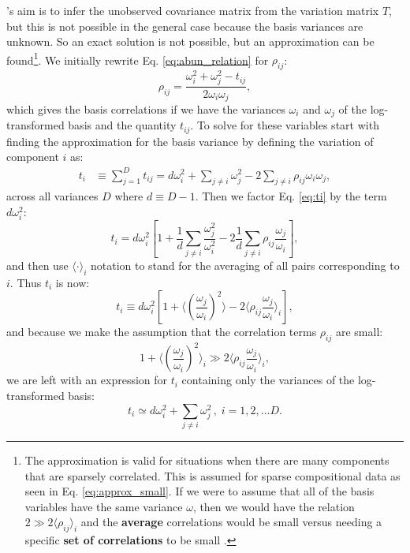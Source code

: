 \citeauthor{Friedman2012}'s aim is to infer the unobserved covariance matrix from the variation matrix $T$, but this is not possible in the general case because the basis variances are unknown. So an exact solution is not possible, but an approximation can be found\footnote{The approximation is valid for situations when there are many components that are sparsely correlated. This is assumed for sparse compositional data as seen in Eq. \ref{eq:approx_small}. If we were to assume that all of the basis variables have the same variance $\omega$, then we would have the relation $2 \gg 2 \langle \rho_{ij} \rangle_i$ and the \textbf{average} correlations would be small versus needing a specific \textbf{set of correlations} to be small \citep{Friedman2012}. }.
We initially rewrite Eq. \ref{eq:abun_relation} for $\rho_{ij}$:
\begin{equation}\label{eq:rho}
    \rho_{ij} = \frac{\omega_i^2 + \omega_j^2 -t_{ij}}{2\omega_i \omega_j},
\end{equation}
which gives the basis correlations if we have the variances $\omega_i$ and $\omega_j$ of the log-transformed basis and the quantity $t_{ij}$. To solve for these variables start with finding the approximation for the basis variance by defining the variation of component $i$ as:
\begin{equation}\label{eq:ti}
    \begin{split}
        t_i & \equiv \sum_{j=1}^{D}t_{ij}=d \omega^2_i + \sum_{j\neq i}\omega_j^2 -2\sum_{j\neq i} \rho_{ij}\omega_i \omega_j,
    \end{split}
\end{equation}
across all variances $D$ where $d\equiv D-1$. Then we factor Eq. \ref{eq:ti} by the term $d\omega_i^2$:
\begin{equation}
    t_i = d\omega_i^2  \left[ 1 + \frac{1}{d} \sum_{j \neq i}\frac{\omega_j^2}{\omega_i^2} -2 \frac{1}{d} \sum_{j \neq i}\rho_{ij} \frac{\omega_j}{\omega_i} \right],
\end{equation}
and then use $\langle \cdot \rangle_i$ notation to stand for the averaging of all pairs corresponding to $i$. Thus $t_i$ is now:
\begin{equation}\label{eq:ti_avg}
    t_i \equiv d\omega_i^2 \left[ 1 + \langle \left(\frac{\omega_j}{\omega_i}\right)^2 \rangle - 2 \langle \rho_{ij} \frac{\omega_j}{\omega_i} \rangle_i \right],
\end{equation}
and because we make the assumption that the correlation terms $\rho_{ij}$ are small:
\begin{equation}\label{eq:approx_small}
    1+\langle \left( \frac{\omega_j}{\omega_i} \right)^2 \rangle_i \gg 2\langle \rho_{ij}\frac{\omega_j}{\omega_i}\rangle_i,
\end{equation}
we are left with an expression for $t_i$ containing only the variances of the log-transformed basis:
\begin{equation}\label{eq:final_ti}
    t_i \simeq d\omega_i^2 + \sum_{j \neq i}\omega_j^2 \, , \; i = 1,2,...D.
\end{equation}

